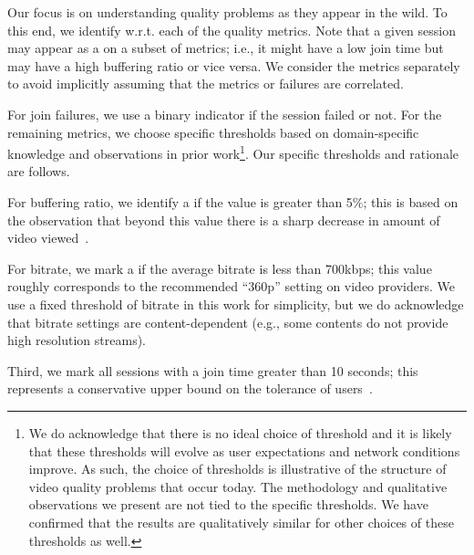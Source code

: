 Our focus  is on understanding quality problems as they appear 
in the wild. 
To this end, we identify \problemsessions w.r.t. each of the 
quality metrics. Note that a given session may appear as a 
\problemsession on a subset of  metrics; i.e., it might have a low
join time but may have a high buffering ratio or vice versa. 
We consider the  metrics separately to avoid implicitly 
assuming that the metrics or failures are correlated.

\begin{packeditemize}
\item For join failures, we use a binary indicator if the 
session failed or not.  
For the remaining metrics, we choose specific 
thresholds based on domain-specific
knowledge and observations in prior work\footnote{
We do acknowledge that there is no ideal choice of 
threshold and it is likely that these thresholds will evolve 
as user expectations and network conditions improve. 
As such, the choice of thresholds is illustrative of the 
structure of video quality problems that occur today. 
The methodology and qualitative observations we 
present are not  tied to the  specific  thresholds.
We have confirmed that the results are qualitatively 
similar for other choices  of these thresholds as well. }.  
Our specific thresholds and rationale are follows.
\item For buffering ratio, we identify a \problemsession 
if the value is greater than 5\%; this is based on the 
observation that beyond this value there is a sharp 
decrease in amount of video viewed~\cite{sigcomm11}.  
\item For bitrate, we mark a \problemsession if the average
bitrate is less than 700kbps; this value roughly
 corresponds to the recommended ``360p'' setting on 
 video providers. 
We use a fixed threshold of bitrate in this work for 
simplicity, but we do acknowledge that bitrate settings 
are content-dependent (e.g., some contents do not provide 
high resolution streams).
\item Third,  we mark all sessions with a join
time greater than 10 seconds; this represents a 
conservative upper bound on the
tolerance of users~\cite{webhci1,akamai-imc12}.  
\end{packeditemize}

